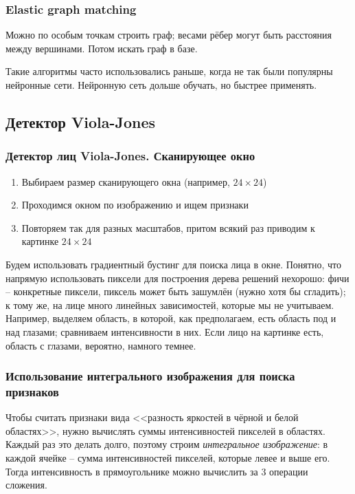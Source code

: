 \documentclass[main.tex]{subfiles}
\begin{document}
\subsubsection{Elastic graph matching}

Можно по особым точкам строить граф; весами рёбер могут быть расстояния между вершинами.
Потом искать граф в базе.

Такие алгоритмы часто использовались раньше, когда не так были популярны нейронные сети.
Нейронную сеть дольше обучать, но быстрее применять.

\subsection{Детектор Viola-Jones}

\subsubsection{ Детектор лиц Viola-Jones. Сканирующее окно }

\begin{enumerate}[noitemsep]
	\item Выбираем размер сканирующего окна (например, $ 24 \times 24 $)
	\item Проходимся окном по изображению и ищем признаки
	\item Повторяем так для разных масштабов, притом всякий раз приводим к картинке $ 24 \times 24 $
\end{enumerate}

Будем использовать градиентный бустинг для поиска лица в окне.
Понятно, что напрямую использовать пиксели для построения дерева решений нехорошо: фичи -- конкретные пиксели, пиксель может быть зашумлён (нужно хотя бы сгладить); к тому же, на лице много линейных зависимостей, которые мы не учитываем.
Например, выделяем область, в которой, как предполагаем, есть область под и над глазами; сравниваем интенсивности в них.
Если лицо на картинке есть, область с глазами, вероятно, намного темнее.

\subsubsection{Использование интегрального изображения для поиска признаков}

Чтобы считать признаки вида <<разность яркостей в чёрной и белой областях>>, нужно вычислять суммы интенсивностей пикселей в областях.
Каждый раз это делать долго, поэтому строим \emph{интегральное изображение}: в каждой ячейке -- сумма интенсивностей пикселей, которые левее и выше его.
Тогда интенсивность в прямоугольнике можно вычислить за 3 операции сложения.
\end{document}
